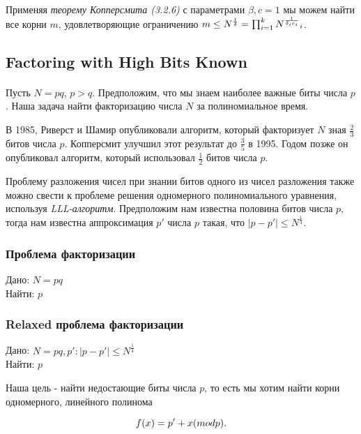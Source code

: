   Применяя \textit{теорему Копперсмита (3.2.6)} с параметрами {$\beta,c=1$} мы можем найти все корни {$m$}, удовлетворяющие ограничению
  {$m \le N^\frac{1}{\delta} = \prod_{i=1}^{k}{N\textsuperscript{{$\frac{1}{\delta_i e_i}$}}_i}$}.

\subsection{Factoring with High Bits Known}

\paragraph{} Пусть {$N = pq$}, {$p > q$}. Предположим, что мы знаем наиболее важные биты числа {$p$}. Наша задача найти факторизацию числа
  {$N$} за полиномиальное время.
  
  В 1985, Риверст и Шамир опубликовали алгоритм, который факторизует {$N$} зная {$\frac{2}{3}$} битов числа {$p$}. Копперсмит улучшил этот результат
  до {$\frac{3}{5}$} в 1995. Годом позже он опубликовал алгоритм, который использовал {$\frac{1}{2}$} битов числа {$p$}.
  
  Проблему разложения чисел при знании битов одного из чисел разложения также можно свести к проблеме решения одномерного полиномиального
  уравнения, используя \textit{LLL-алгоритм}. Предположим нам известна половина битов числа {$p$}, тогда нам известна аппроксимация {$p'$}
  числа {$p$} такая, что {$|p-p'| \le N^\frac{1}{4}$}.
  
  \subsubsection{Проблема факторизации}
  Дано: {$N = p q$} \\   
  Найти: {$p$}  
  
  \subsubsection{Relaxed проблема факторизации}
  Дано: {$ N = p q, p': |p-p'| \le N^\frac{1}{4} $} \\   
  Найти: {$p$}  
  
  Наша цель - найти недостающие биты числа {$p$}, то есть мы хотим найти корни одномерного, линейного полинома
  
    \begin{equation}
     \textit{{$ f(x) = p' + x (mod p) $}}.
    \end{equation}

